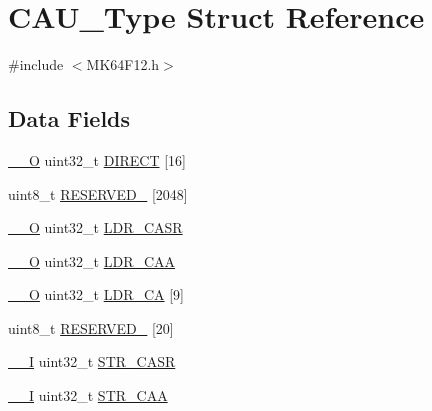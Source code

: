 \hypertarget{struct_c_a_u___type}{}\section{C\+A\+U\+\_\+\+Type Struct Reference}
\label{struct_c_a_u___type}


{\ttfamily \#include $<$M\+K64\+F12.\+h$>$}

\subsection*{Data Fields}
\begin{DoxyCompactItemize}
\item 
\mbox{\hyperlink{core__cm4_8h_a7e25d9380f9ef903923964322e71f2f6}{\+\_\+\+\_\+O}} uint32\+\_\+t \mbox{\hyperlink{group___v_r_e_f___peripheral___access___layer_ga7d0c035500e69d383300e0d668d13a54}{D\+I\+R\+E\+CT}} \mbox{[}16\mbox{]}
\item 
uint8\+\_\+t \mbox{\hyperlink{group___v_r_e_f___peripheral___access___layer_ga466296441eef561a0b5b1146e008a92c}{R\+E\+S\+E\+R\+V\+E\+D\+\_}} \mbox{[}2048\mbox{]}
\item 
\mbox{\hyperlink{core__cm4_8h_a7e25d9380f9ef903923964322e71f2f6}{\+\_\+\+\_\+O}} uint32\+\_\+t \mbox{\hyperlink{group___v_r_e_f___peripheral___access___layer_ga52fad60ce449396fd0dda3f7865dd542}{L\+D\+R\+\_\+\+C\+A\+SR}}
\item 
\mbox{\hyperlink{core__cm4_8h_a7e25d9380f9ef903923964322e71f2f6}{\+\_\+\+\_\+O}} uint32\+\_\+t \mbox{\hyperlink{group___v_r_e_f___peripheral___access___layer_gacea2f4c55625e6357485c7b17095084b}{L\+D\+R\+\_\+\+C\+AA}}
\item 
\mbox{\hyperlink{core__cm4_8h_a7e25d9380f9ef903923964322e71f2f6}{\+\_\+\+\_\+O}} uint32\+\_\+t \mbox{\hyperlink{group___v_r_e_f___peripheral___access___layer_ga893c71c21b4b55e6a7c84accb517e149}{L\+D\+R\+\_\+\+CA}} \mbox{[}9\mbox{]}
\item 
uint8\+\_\+t \mbox{\hyperlink{group___v_r_e_f___peripheral___access___layer_ga7c4bd80405f38ccb35aaefc0f779684a}{R\+E\+S\+E\+R\+V\+E\+D\+\_}} \mbox{[}20\mbox{]}
\item 
\mbox{\hyperlink{core__cm4_8h_af63697ed9952cc71e1225efe205f6cd3}{\+\_\+\+\_\+I}} uint32\+\_\+t \mbox{\hyperlink{group___v_r_e_f___peripheral___access___layer_gad22ce20e7ca15c2fdb392414d4a934a6}{S\+T\+R\+\_\+\+C\+A\+SR}}
\item 
\mbox{\hyperlink{core__cm4_8h_af63697ed9952cc71e1225efe205f6cd3}{\+\_\+\+\_\+I}} uint32\+\_\+t \mbox{\hyperlink{group___v_r_e_f___peripheral___access___layer_gab3ad8bd9d03821985fc068bdb44cb79d}{S\+T\+R\+\_\+\+C\+AA}}

\end{DoxyCompactItemize}
